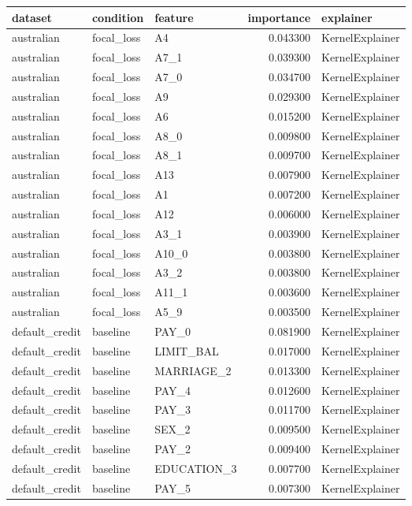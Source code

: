 \begin{tabular}{lllrl}
\toprule
dataset & condition & feature & importance & explainer \\
\midrule
australian & focal_loss & A4 & 0.043300 & KernelExplainer \\
australian & focal_loss & A7_1 & 0.039300 & KernelExplainer \\
australian & focal_loss & A7_0 & 0.034700 & KernelExplainer \\
australian & focal_loss & A9 & 0.029300 & KernelExplainer \\
australian & focal_loss & A6 & 0.015200 & KernelExplainer \\
australian & focal_loss & A8_0 & 0.009800 & KernelExplainer \\
australian & focal_loss & A8_1 & 0.009700 & KernelExplainer \\
australian & focal_loss & A13 & 0.007900 & KernelExplainer \\
australian & focal_loss & A1 & 0.007200 & KernelExplainer \\
australian & focal_loss & A12 & 0.006000 & KernelExplainer \\
australian & focal_loss & A3_1 & 0.003900 & KernelExplainer \\
australian & focal_loss & A10_0 & 0.003800 & KernelExplainer \\
australian & focal_loss & A3_2 & 0.003800 & KernelExplainer \\
australian & focal_loss & A11_1 & 0.003600 & KernelExplainer \\
australian & focal_loss & A5_9 & 0.003500 & KernelExplainer \\
default_credit & baseline & PAY_0 & 0.081900 & KernelExplainer \\
default_credit & baseline & LIMIT_BAL & 0.017000 & KernelExplainer \\
default_credit & baseline & MARRIAGE_2 & 0.013300 & KernelExplainer \\
default_credit & baseline & PAY_4 & 0.012600 & KernelExplainer \\
default_credit & baseline & PAY_3 & 0.011700 & KernelExplainer \\
default_credit & baseline & SEX_2 & 0.009500 & KernelExplainer \\
default_credit & baseline & PAY_2 & 0.009400 & KernelExplainer \\
default_credit & baseline & EDUCATION_3 & 0.007700 & KernelExplainer \\
default_credit & baseline & PAY_5 & 0.007300 & KernelExplainer \\

\end{tabular}
